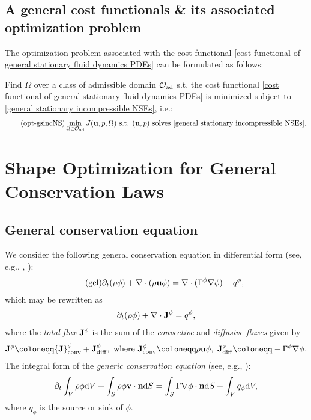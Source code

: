 \documentclass[oneside,11pt]{book}
\numberwithin{equation}{section}
\begin{document}
\section{A general cost functionals \& its associated optimization problem}
The optimization problem associated with the cost functional \eqref{cost functional of general stationary fluid dynamics PDEs} can be formulated as follows:

Find $\Omega$ over a class of admissible domain $\mathcal{O}_{\rm ad}$ s.t. the cost functional \eqref{cost functional of general stationary fluid dynamics PDEs} is minimized subject to \eqref{general stationary incompressible NSEs}, i.e.:
\begin{align}
    \label{optimization problem for general stationary incompressible NSEs}
    \tag{opt-gsincNS}
    \min_{\Omega\in\mathcal{O}_{\rm ad}} J({\bf u},p,\Omega) \mbox{ s.t. } ({\bf u},p) \mbox{ solves } \eqref{general stationary incompressible NSEs}.
\end{align}


\chapter{Shape Optimization for General Conservation Laws}

\section{General conservation equation}
We consider the following general conservation equation in differential form (see, e.g., \cite{Ferziger_Peric_Street2020}, \cite[Sect. 3.7]{Moukalled_Mangani_Darwish2016}):
\begin{align}
    \label{general conservation: differential form}
    \tag{gcl}
    \partial_t(\rho\phi) + \nabla\cdot(\rho{\bf u}\phi) = \nabla\cdot(\Gamma^\phi\nabla\phi) + q^\phi,
\end{align}
which may be rewritten as
\begin{align*}
    \partial_t(\rho\phi) + \nabla\cdot{\bf J}^\phi = q^\phi,
\end{align*}
where the \textit{total flux} ${\bf J}^\phi$ is the sum of the \textit{convective} and \textit{diffusive fluxes} given by
\begin{align*}
    {\bf J}^\phi\coloneqq{\bf J}_{\rm conv}^\phi + {\bf J}_{\rm diff}^\phi,\mbox{ where }{\bf J}_{\rm conv}^\phi\coloneqq\rho{\bf u}\phi,\ {\bf J}_{\rm diff}^\phi\coloneqq-\Gamma^\phi\nabla\phi.
\end{align*}
The integral form of the \textit{generic conservation equation} (see, e.g., \cite{Ferziger_Peric_Street2020}):
\begin{align*}
    \partial_t\int_V \rho\phi{\rm d}V + \int_S \rho\phi{\bf v}\cdot{\bf n}{\rm d}S = \int_S \Gamma\nabla\phi\cdot{\bf n}{\rm d}S + \int_V q_\phi{\rm d}V,
\end{align*}
where $q_\phi$ is the source or sink of $\phi$.
\end{document}
